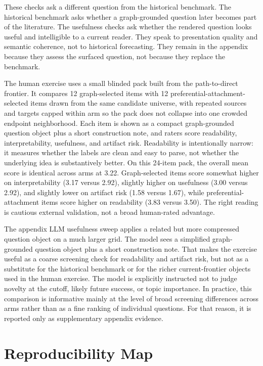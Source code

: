 \documentclass[11pt]{article}
\begin{document}
These checks ask a different question from the historical benchmark. The historical
benchmark asks whether a graph-grounded question later becomes part of the literature. The
usefulness checks ask whether the rendered question looks useful and intelligible to a
current reader. They speak to presentation quality and semantic coherence, not to
historical forecasting. They remain in the appendix because they assess the surfaced
question, not because they replace the benchmark.

The human exercise uses a small blinded pack built from the path-to-direct frontier. It
compares 12 graph-selected items with 12 preferential-attachment-selected items drawn from
the same candidate universe, with repeated sources and targets capped within arm so the pack
does not collapse into one crowded endpoint neighborhood. Each item is shown as a compact
graph-grounded question object plus a short construction note, and raters score
readability, interpretability, usefulness, and artifact risk. Readability is intentionally
narrow: it measures whether the labels are clean and easy to parse, not whether the
underlying idea is substantively better. On this 24-item pack, the overall mean score is
identical across arms at 3.22. Graph-selected items score somewhat higher on
interpretability (3.17 versus 2.92), slightly higher on usefulness (3.00 versus 2.92), and
slightly lower on artifact risk (1.58 versus 1.67), while preferential-attachment items
score higher on readability (3.83 versus 3.50). The right reading is cautious external
validation, not a broad human-rated advantage.

The appendix LLM usefulness sweep applies a related but more compressed question object on a
much larger grid. The model sees a simplified graph-grounded question object plus a short
construction note. That makes the exercise useful as a coarse screening check for
readability and artifact risk, but not as a substitute for the historical benchmark or for
the richer current-frontier objects used in the human exercise. The model is explicitly
instructed not to judge novelty at the cutoff, likely future success, or topic importance.
In practice, this comparison is informative mainly at the level of broad screening
differences across arms rather than as a fine ranking of individual questions. For that
reason, it is reported only as supplementary appendix evidence.



\section{Reproducibility Map}
\label{app:reproducibility-map}
\end{document}
